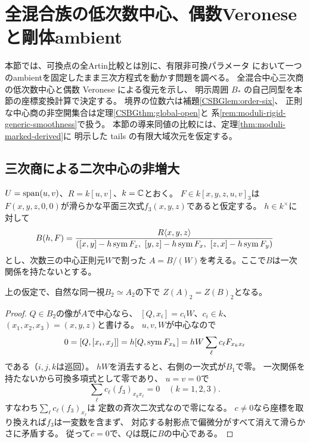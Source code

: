 \section{全混合族の低次数中心、偶数Veroneseと剛体ambient}
\label{sec:moduli-rigid-ambient}
本節では、可換点の全Artin比較とは別に、有限非可換パラメータ
において一つのambientを固定したまま三次方程式を動かす問題を調べる。
全混合中心三次商の低次数中心と偶数 Veronese による復元を示し、
明示周囲 $B_*$ の自己同型を本節の座標変換計算で決定する。
境界の位数六は補題\ref{CSBGlem:order-six}、
正則な中心商の非空開集合は定理\ref{CSBGthm:global-open}と
系\ref{rem:moduli-rigid-generic-smoothness}で扱う。
本節の導来同値の比較には、定理\ref{thm:moduli-marked-derived}に
明示した tails の有限大域次元を仮定する。

\subsection{三次商による二次中心の非増大}
$U=\operatorname{span}(u,v)$、$R=k[u,v]$、$k=\mathbb C$とおく。
$F\in k[x,y,z,u,v]_3$は
$F(x,y,z,0,0)$が滑らかな平面三次式$f_3(x,y,z)$であると仮定する。
$h\in k^\times$に対して
\[
 B(h,F)=\frac{R\langle x,y,z\rangle}
 {([x,y]-h\operatorname{sym} F_z,\ [y,z]-h\operatorname{sym} F_x,\
    [z,x]-h\operatorname{sym} F_y)}
\]
とし、次数三の中心正則元$W$で割った
$A=B/(W)$を考える。ここで$B$は一次関係を持たないとする。

\begin{lemma}[中心三次商では二次中心が増えない]
\label{lem:moduli-no-new-quadratic-center}
上の仮定で、自然な同一視$B_2\simeq A_2$の下で
$Z(A)_2=Z(B)_2$となる。
\end{lemma}
\begin{proof}
$Q\in B_2$の像が$A$で中心なら、
$[Q,x_i]=c_iW$、$c_i\in k$、
$(x_1,x_2,x_3)=(x,y,z)$と書ける。
$u,v,W$が中心なので
\[
 0=[Q,[x_i,x_j]]
 =h[Q,\operatorname{sym} F_{x_k}]
 =hW\sum_\ell c_\ell F_{x_kx_\ell}
\]
である（$i,j,k$は巡回）。
$hW$を消去すると、右側の一次式が$B_1$で零。
一次関係を持たないから可換多項式として零であり、
$u=v=0$で
\[
  \sum_\ell c_\ell(f_3)_{x_kx_\ell}=0
  \quad(k=1,2,3).
\]
すなわち$\sum_\ell c_\ell(f_3)_{x_\ell}$は
定数の斉次二次式なので零になる。
$c\ne0$なら座標を取り換えれば$f_3$は一変数を含まず、
対応する射影点で偏微分がすべて消えて滑らかさに矛盾する。
従って$c=0$で、$Q$は既に$B$の中心である。
\end{proof}

